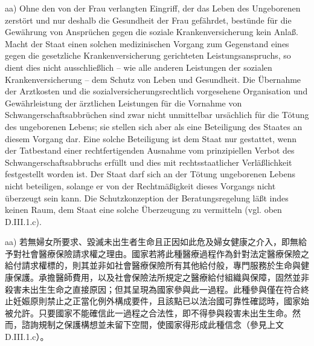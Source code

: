 \documentclass[12pt]{article}
\begin{document}
\begin{sourcepara}[title={原文E.204}]
aa) Ohne den von der Frau verlangten Eingriff, der das Leben des Ungeborenen zerstört und nur deshalb die Gesundheit der Frau gefährdet, bestünde für die Gewährung von Ansprüchen gegen die soziale Krankenversicherung kein Anlaß. Macht der Staat einen solchen medizinischen Vorgang zum Gegenstand eines gegen die gesetzliche Krankenversicherung gerichteten Leistungsanspruchs, so dient dies nicht ausschließlich -- wie alle anderen Leistungen der sozialen Krankenversicherung -- dem Schutz von Leben und Gesundheit. Die Übernahme der Arztkosten und die sozialversicherungsrechtlich vorgesehene Organisation und Gewährleistung der ärztlichen Leistungen für die Vornahme von Schwangerschaftsabbrüchen sind zwar nicht unmittelbar ursächlich für die Tötung des ungeborenen Lebens; sie stellen sich aber als eine Beteiligung des Staates an diesem Vorgang dar. Eine solche Beteiligung ist dem Staat nur gestattet, wenn der Tatbestand einer rechtfertigenden Ausnahme vom prinzipiellen Verbot des Schwangerschaftsabbruchs erfüllt und dies mit rechtsstaatlicher Verläßlichkeit festgestellt worden ist. Der Staat darf sich an der Tötung ungeborenen Lebens nicht beteiligen, solange er von der Rechtmäßigkeit dieses Vorgangs nicht überzeugt sein kann. Die Schutzkonzeption der Beratungsregelung läßt indes keinen Raum, dem Staat eine solche Überzeugung zu vermitteln (vgl. oben D.III.1.c).
\end{sourcepara}
\begin{transpara}
aa) 若無婦女所要求、毀滅未出生者生命且正因如此危及婦女健康之介入，即無給予對社會醫療保險請求權之理由。國家若將此種醫療過程作為針對法定醫療保險之給付請求權標的，則其並非如社會醫療保險所有其他給付般，專門服務於生命與健康保護。承擔醫師費用，以及社會保險法所規定之醫療給付組織與保障，固然並非殺害未出生生命之直接原因；但其呈現為國家參與此一過程。此種參與僅在符合終止妊娠原則禁止之正當化例外構成要件，且該點已以法治國可靠性確認時，國家始被允許。只要國家不能確信此一過程之合法性，即不得參與殺害未出生生命。然而，諮詢規制之保護構想並未留下空間，使國家得形成此種信念（參見上文 D.III.1.c）。
\end{transpara}
\end{document}
